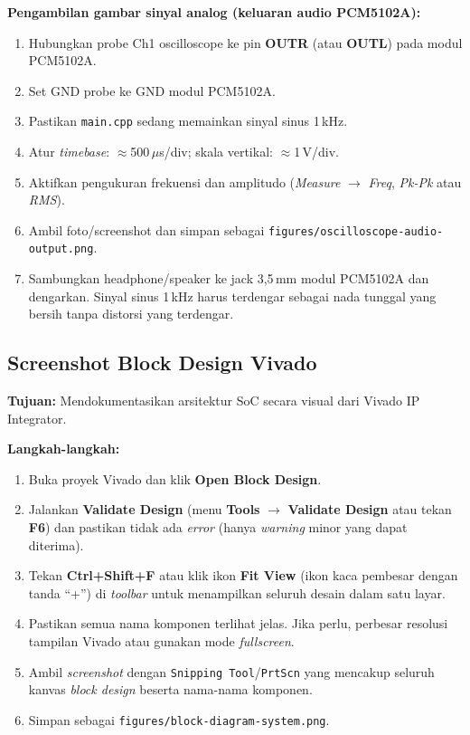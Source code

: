 \textbf{Pengambilan gambar sinyal analog (keluaran audio PCM5102A):}
\begin{enumerate}
\item Hubungkan probe Ch1 oscilloscope ke pin \textbf{OUTR} (atau \textbf{OUTL})
      pada modul PCM5102A.
\item Set GND probe ke GND modul PCM5102A.
\item Pastikan \texttt{main.cpp} sedang memainkan sinyal sinus 1\,kHz.
\item Atur \textit{timebase}: $\approx$500\,$\mu$s/div; skala vertikal:
      $\approx$1\,V/div.
\item Aktifkan pengukuran frekuensi dan amplitudo (\textit{Measure} $\to$ \textit{Freq},
      \textit{Pk-Pk} atau \textit{RMS}).
\item Ambil foto/screenshot dan simpan sebagai \texttt{figures/oscilloscope-audio-output.png}.
\item Sambungkan headphone/speaker ke jack 3,5\,mm modul PCM5102A dan dengarkan.
      Sinyal sinus 1\,kHz harus terdengar sebagai nada tunggal yang bersih tanpa
      distorsi yang terdengar.
\end{enumerate}

\subsection{Screenshot Block Design Vivado}
\label{app:panduan-blockdesign}

\textbf{Tujuan:} Mendokumentasikan arsitektur SoC secara visual dari Vivado IP Integrator.

\textbf{Langkah-langkah:}
\begin{enumerate}
\item Buka proyek Vivado dan klik \textbf{Open Block Design}.
\item Jalankan \textbf{Validate Design} (menu \textbf{Tools} $\to$ \textbf{Validate Design}
      atau tekan \textbf{F6}) dan pastikan tidak ada \textit{error} (hanya \textit{warning}
      minor yang dapat diterima).
\item Tekan \textbf{Ctrl+Shift+F} atau klik ikon \textbf{Fit View} (ikon kaca pembesar
      dengan tanda ``+'') di \textit{toolbar} untuk menampilkan seluruh desain dalam
      satu layar.
\item Pastikan semua nama komponen terlihat jelas. Jika perlu, perbesar resolusi tampilan
      Vivado atau gunakan mode \textit{fullscreen}.
\item Ambil \textit{screenshot} dengan \texttt{Snipping Tool}/\texttt{PrtScn} yang
      mencakup seluruh kanvas \textit{block design} beserta nama-nama komponen.
\item Simpan sebagai \texttt{figures/block-diagram-system.png}.
\end{enumerate}
